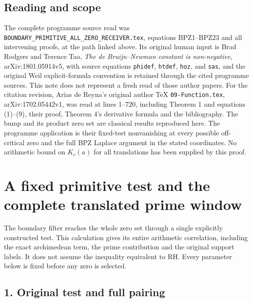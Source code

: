 \documentclass[
  10pt,
  a4paper,
]{article}
\begin{document}
\subsection{Reading and scope}\label{reading-and-scope}

The complete programme source read was
\texttt{BOUNDARY\_\allowbreak{}PRIMITIVE\_\allowbreak{}ALL\_\allowbreak{}ZERO\_\allowbreak{}RECEIVER.\allowbreak{}tex}, equations
BPZ1--BPZ23 and all intervening proofs, at the path linked above. Its
original human input is Brad Rodgers and Terence Tao, \emph{The de
Bruijn--Newman constant is non-negative}, arXiv:1801.05914v5, with
source equations \texttt{phidef}, \texttt{htdef}, \texttt{hoz}, and
\texttt{sas}, and the original Weil explicit-formula convention is
retained through the cited programme sources. This note does not
represent a fresh read of those author papers. For the citation
revision, Arias de Reyna's original author TeX \texttt{09-\allowbreak{}Function.\allowbreak{}tex},
arXiv:1702.05442v1, was read at lines 1--720, including Theorem 1 and
equations (1)--(9), their proof, Theorem 4's derivative formula and the
bibliography. The bump and its product zero set are classical results
reproduced here. The programme application is their fixed-test
nonvanishing at every possible off-critical zero and the full BPZ
Laplace argument in the stated coordinates. No arithmetic bound on
\(K_r(a)\) for all translations has been supplied by this proof.

\clearpage

\section{A fixed primitive test and the complete translated prime
window}\label{a-fixed-primitive-test-and-the-complete-translated-prime-window}

The boundary filter reaches the whole zero set through a single
explicitly constructed test. This calculation gives its entire
arithmetic correlation, including the exact archimedean term, the prime
contribution and the original support labels. It does not assume the
inequality equivalent to RH. Every parameter below is fixed before any
zero is selected.

\subsection{1. Original test and full
pairing}\label{original-test-and-full-pairing}
\end{document}
